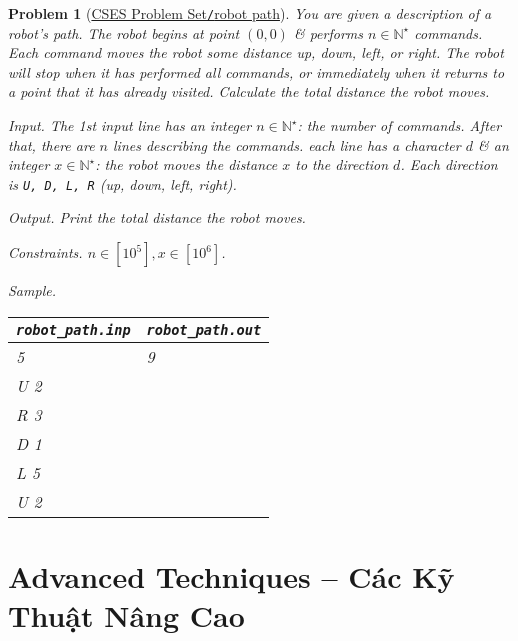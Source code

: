 \documentclass{article}
\newtheorem{problem}{Problem}
\begin{document}
\begin{problem}[\href{https://cses.fi/problemset/task/1742}{CSES Problem Set{\tt/}robot path}]
    You are given a description of a robot's path. The robot begins at point $(0,0)$ \& performs $n\in\mathbb{N}^\star$ commands. Each command moves the robot some distance up, down, left, or right. The robot will stop when it has performed all commands, or immediately when it returns to a point that it has already visited. Calculate the total distance the robot moves.
    \item {\sf Input.} The 1st input line has an integer $n\in\mathbb{N}^\star$: the number of commands. After that, there are $n$ lines describing the commands. each line has a character $d$ \& an integer $x\in\mathbb{N}^\star$: the robot moves the distance $x$ to the direction $d$. Each direction is {\tt U, D, L, R} (up, down, left, right).
    \item {\sf Output.} Print the total distance the robot moves.
    \item {\sf Constraints.} $n\in[10^5],x\in[10^6]$.
    \item {\sf Sample.}
    \begin{table}[H]
        \centering
        \begin{tabular}{|l|l|}
            \hline
            \verb|robot_path.inp| & \verb|robot_path.out| \\
            \hline
            5 & 9 \\
            U 2 & \\
            R 3 & \\
            D 1 & \\
            L 5 & \\
            U 2 & \\
            \hline
        \end{tabular}
    \end{table}
\end{problem}


\section{Advanced Techniques -- Các Kỹ Thuật Nâng Cao}
\end{document}
